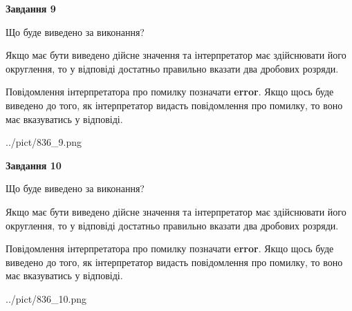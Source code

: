 \documentclass[12pt, ukrainian]{article}
\begin{document}
{\begin {Large}
{\begin {center}\textbf{Завдання 9}\end {center}}\par
Що буде виведено за виконання? \par

Якщо має бути виведено дійсне значення та інтерпретатор має здійснювати його округлення, 
то у відповіді достатньо правильно вказати два дробових розряди.

Повідомлення інтерпретатора про помилку позначати \textbf{error}.
Якщо щось буде виведено до того, як інтерпретатор видасть повідомлення про помилку, 
то воно має вказуватись у відповіді. \par

\begin{center}
	{../pict/836_9.png}
\end{center}
\newpage

{\begin {center}\textbf{Завдання 10}\end {center}}\par
Що буде виведено за виконання? \par

Якщо має бути виведено дійсне значення та інтерпретатор має здійснювати його округлення, 
то у відповіді достатньо правильно вказати два дробових розряди.

Повідомлення інтерпретатора про помилку позначати \textbf{error}.
Якщо щось буде виведено до того, як інтерпретатор видасть повідомлення про помилку, 
то воно має вказуватись у відповіді. \par

\begin{center}
	{../pict/836_10.png}
\end{center}
\newpage

\end {Large}}
\end{document}
